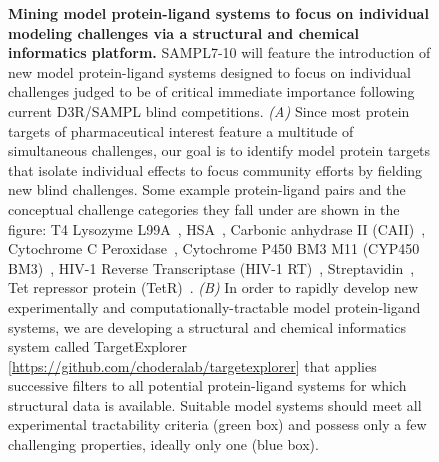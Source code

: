 \documentclass[11pt]{article}
\begin{document}
\begin{figure}[h]
\begin{centering}
\end{centering}
\vspace{0.1in}
\caption{\footnotesize {\bf Mining model protein-ligand systems to focus on individual modeling challenges via a structural and chemical informatics platform.}
SAMPL7-10 will feature the introduction of new model protein-ligand systems designed to focus on individual challenges judged to be of critical immediate importance following current D3R/SAMPL blind competitions. 
\emph{(A)} Since most protein targets of pharmaceutical interest feature a multitude of simultaneous challenges, our goal is to identify model protein targets that isolate individual effects to focus community efforts by fielding new blind challenges. Some example protein-ligand pairs and the conceptual challenge categories they fall under are shown in the figure: 
T4 Lysozyme L99A~\cite{mobley_predicting_2007}, HSA~\cite{Martin:2009:JournalofComputer-AidedMolecularDesign}, Carbonic anhydrase II (CAII)~\cite{Martin:2009:JournalofComputer-AidedMolecularDesign,Temperini:2009:Bioorganic&MedicinalChemistry}, Cytochrome C Peroxidase~\cite{Rocklin:2013:JournalofMolecularBiology}, Cytochrome P450 BM3 M11 (CYP450 BM3)~\cite{Venkataraman:2014:Bioorganic&MedicinalChemistry}, HIV-1 Reverse Transcriptase (HIV-1 RT)~\cite{Gunasekaran:2007:JournalofMolecularBiology,Khunnawutmanotham:2009:BeilsteinJournalofOrganicChemistry}, Streptavidin~\cite{Gunasekaran:2007:JournalofMolecularBiology}, Tet repressor protein (TetR)~\cite{Gunasekaran:2007:JournalofMolecularBiology,Aleksandrov:2007:ChemBioChem}.
\emph{(B)} In order to rapidly develop new experimentally and computationally-tractable model protein-ligand systems, we are developing a structural and chemical informatics system called TargetExplorer [\url{https://github.com/choderalab/targetexplorer}] that applies successive filters to all potential protein-ligand systems for which structural data is available. 
Suitable model systems should meet all experimental tractability criteria (green box) and possess only a few challenging properties, ideally only one (blue box).
\vspace{-0.1in}
\label{figure:mining-for-model-systems}}
\end{figure}
\end{document}
